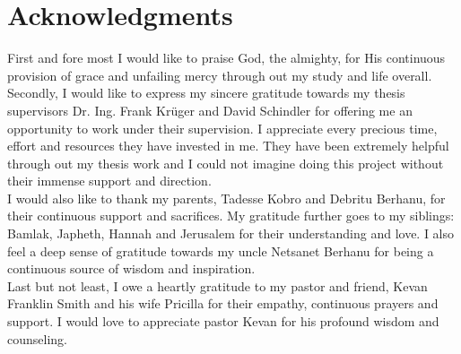 
\bigskip

\begingroup
\let\clearpage\relax
\let\cleardoublepage\relax
\let\cleardoublepage\relax
\chapter*{Acknowledgments}

First and fore most I would like to praise God, the almighty, for His continuous provision of grace and unfailing mercy through out my study and life overall. \\

Secondly, I would like to express my sincere gratitude towards my thesis supervisors Dr. Ing. Frank Krüger and David Schindler for offering me an opportunity to work under their supervision. I appreciate every precious time, effort and resources they have invested in me. They have been extremely  helpful through out my thesis work and I could not imagine doing this project without their immense support and direction. \\

I would also like to thank my parents, Tadesse Kobro and Debritu Berhanu, for their continuous support and sacrifices. My gratitude further goes to my siblings: Bamlak, Japheth, Hannah and Jerusalem for their understanding and love.   I also feel a deep sense of gratitude towards my uncle Netsanet Berhanu for being a continuous source of wisdom and inspiration. \\

Last but not least, I owe a heartly gratitude to my pastor and friend, Kevan Franklin Smith and his wife Pricilla for their empathy, continuous prayers and support.  I would love to appreciate pastor Kevan for his profound wisdom and counseling. 



\bigskip


\endgroup



